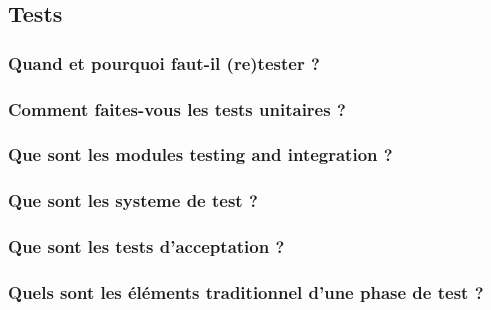 \subsection{Tests}



\subsubsection{Quand et pourquoi faut-il (re)tester ?}



\subsubsection{Comment faites-vous les tests unitaires ?}



\subsubsection{Que sont les modules testing and integration ?}



\subsubsection{Que sont les systeme de test ?}



\subsubsection{Que sont les tests d'acceptation ?}



\subsubsection{Quels sont les éléments traditionnel d'une phase de test ?}